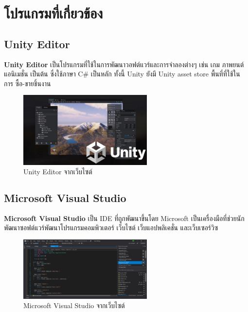 
\section{โปรแกรมที่เกี่ยวข้อง}
\subsection{Unity Editor}
\subsubitem \textbf{Unity Editor} \cite{unity:program} เป็นโปรแกรมที่ใช้ในการพัฒนาวอฟต์แวร์และการจำลองต่างๆ เช่น เกม ภาพยนต์ แอนิเมชั่น เป็นต้น ซึ่งใช้ภาษา C$\#$ เป็นหลัก ทั้งนี้ Unity ยังมี Unity asset store พื้นที่ที่ใช้ในการ ซื้อ-ขายชิ้นงาน
\begin{figure}[h]
  \centering
  \includegraphics[width=0.6\textwidth, height=0.2\textheight]{Images/unity-engine-landscape-swimlane.png}
  \caption{Unity Editor จากเว็บไซต์}\label{Unity}
\end{figure}

\subsection{Microsoft Visual Studio}
\subsubitem \textbf{Microsoft Visual Studio} \cite{microsoft-visual-studios:program} เป็น IDE ที่ถูกพัฒนาขึ้นโดย Microsoft เป็นเครื่องมือที่ช่วยนักพัฒนาซอฟต์แวร์พัฒนาโปรแกรมคอมพิวเตอร์ เว็บไซต์ เว็บแอปพลิเคชั่น และเว็บเซอร์วิซ
\begin{figure}[h]
  \centering
  \includegraphics[width=0.6\textwidth, height=0.2\textheight]{Images/python-development-cropped.jpg}
  \caption{Microsoft Visual Studio จากเว็บไซต์}\label{Microsoft}
\end{figure}

